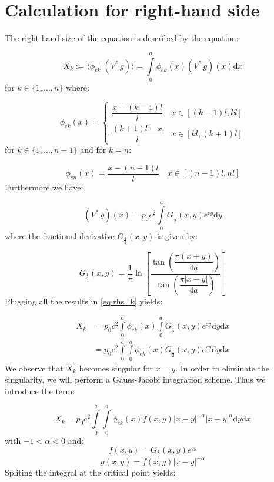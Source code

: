 \documentclass[12pt,letterpaper]{article}
\theoremstyle{definition}
\numberwithin{equation}{subsection}
\newcommand{\dd}{\text{d}}
\begin{document}
\section*{Calculation for right-hand side}

The right-hand size of the equation is described by the equation:

\begin{equation} \label{eq:rhs_k}
    X_{k} := \langle \phi_{ek} | (V^* \, g) \rangle = \int\limits_0^a \phi_{ek}(x)(V^* \, g) (x) \dd x 
\end{equation}
for $k \in \{1, \dots, n\}$ where:

\begin{equation}
    \phi_{ek}(x) =
    \begin{cases}
        \dfrac{x - (k-1)l}{l} \quad x \in [(k-1)l, kl] \\[10pt]
        \dfrac{(k+1)l - x}{l} \quad x \in [kl, (k+1)l]
    \end{cases}
\end{equation}
for $k \in \{1, \dots, n-1\}$ and for $k=n$:

\begin{equation}
    \phi_{en}(x) =
    \dfrac{x - (n-1)l}{l} \quad x \in [(n-1)l, nl]
\end{equation}
Furthermore we have:

\begin{equation}
    (V^* \, g)(x) = p_0 c^2 \int\limits_0^a G_{\frac{1}{2}}(x,y)e^{cy}\dd y
\end{equation}
where the fractional derivative $G_{\frac{1}{2}}(x,y)$ is given by:

\begin{equation}
    G_{\frac{1}{2}}(x,y) = \dfrac{1}{\pi} \ln \left[\dfrac{\tan\left(\dfrac{\pi (x+y)}{4a}\right)}{\tan\left(\dfrac{\pi |x-y|}{4a}\right)}\right]
\end{equation}
Plugging all the results in \ref{eq:rhs_k} yields:

\begin{align}
    X_{k} &= p_0 c^2 \int\limits_0^a \phi_{ek}(x)\int\limits_0^a G_{\frac{1}{2}}(x,y)e^{cy}\dd y\dd x \\
    &= p_0 c^2 \int\limits_0^a \int\limits_0^a \phi_{ek}(x)G_{\frac{1}{2}}(x,y)e^{cy}\dd y\dd x
\end{align}
We observe that $X_k$ becomes singular for $x=y$. In order to eliminate the singularity, we will perform a Gauss-Jacobi integration scheme. Thus we introduce the term:

\begin{equation}
    X_{k} = p_0 c^2 \int\limits_0^a \int\limits_0^a \phi_{ek}(x) f(x, y) |x-y|^{-\alpha} |x-y|^{\alpha}\dd y\dd x
\end{equation}
with $-1<\alpha<0$ and:
\begin{equation}
    f(x,y) = G_{\frac{1}{2}}(x,y) e^{cy}
\end{equation}
\begin{equation}
    g(x,y) = f(x,y) |x-y|^{-\alpha}
\end{equation}
Spliting the integral at the critical point yields:
\end{document}
